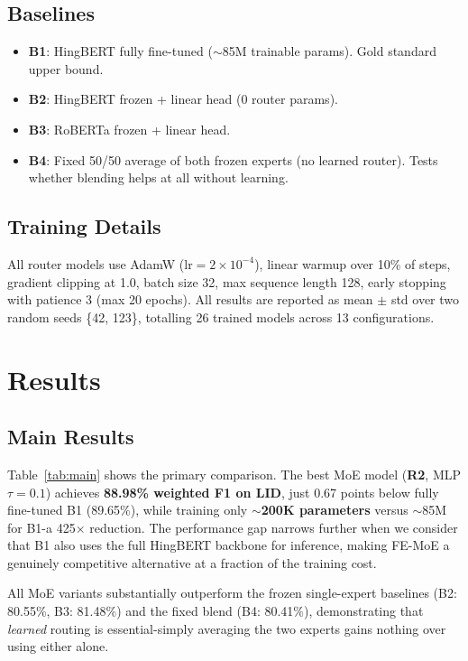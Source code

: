 \documentclass[conference]{IEEEtran}
\begin{document}
\subsection{Baselines}

\begin{itemize}
  \item \textbf{B1}: HingBERT fully fine-tuned ($\sim$85M trainable params). Gold standard upper bound.
  \item \textbf{B2}: HingBERT frozen + linear head (0 router params).
  \item \textbf{B3}: RoBERTa frozen + linear head.
  \item \textbf{B4}: Fixed 50/50 average of both frozen experts (no learned router). Tests whether blending helps at all without learning.
\end{itemize}

\subsection{Training Details}

All router models use AdamW ($\text{lr}{=}2{\times}10^{-4}$), linear warmup over 10\% of steps, gradient clipping at 1.0, batch size 32, max sequence length 128, early stopping with patience 3 (max 20 epochs). All results are reported as mean $\pm$ std over two random seeds \{42, 123\}, totalling 26 trained models across 13 configurations.

\section{Results}

\subsection{Main Results}

Table~\ref{tab:main} shows the primary comparison. The best MoE model (\textbf{R2}, MLP $\tau{=}0.1$) achieves \textbf{88.98\% weighted F1 on LID}, just 0.67 points below fully fine-tuned B1 (89.65\%), while training only \textbf{$\sim$200K parameters} versus $\sim$85M for B1-a 425$\times$ reduction. The performance gap narrows further when we consider that B1 also uses the full HingBERT backbone for inference, making FE-MoE a genuinely competitive alternative at a fraction of the training cost.

All MoE variants substantially outperform the frozen single-expert baselines (B2: 80.55\%, B3: 81.48\%) and the fixed blend (B4: 80.41\%), demonstrating that \textit{learned} routing is essential-simply averaging the two experts gains nothing over using either alone.
\end{document}
